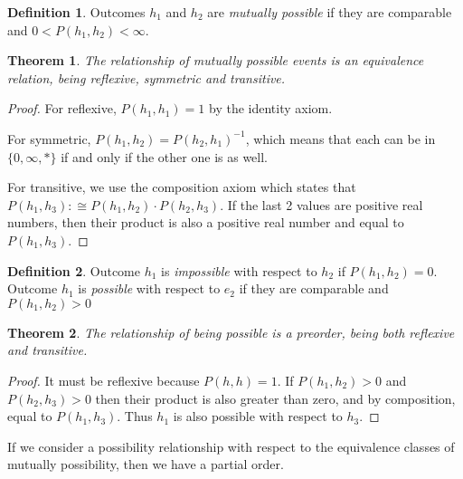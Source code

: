 \documentclass[twoside]{article}
\theoremstyle{plain}%
\newtheorem{theorem}{Theorem}[section]
\theoremstyle{definition}
\newtheorem{definition}{Definition}[section]
\theoremstyle{remark}
\begin{document}
\begin{definition}
Outcomes \(h_1\) and \(h_2\) are \textit{mutually possible} if they are comparable and \(0 < P(h_1, h_2) < \infty\).
\end{definition}

\begin{theorem}
The relationship of mutually possible events is an \textit{equivalence relation}, being reflexive, symmetric and transitive.
\end{theorem}

\begin{proof}
For reflexive, \(P(h_1, h_1) = 1\) by the identity axiom.

For symmetric, \(P(h_1, h_2) = P(h_2, h_1)^{-1}\), which means that each can be in \(\{0, \infty, \ast\}\) if and only if the other one is as well.

For transitive, we use the composition axiom which states that \(P(h_1, h_3) :\cong P(h_1, h_2) \cdot P(h_2, h_3)\). If the last 2 values are positive real numbers, then their product is also a positive real number and equal to \(P(h_1, h_3)\).
\end{proof}

\begin{definition}
Outcome \(h_1\) is \textit{impossible} with respect to \(h_2\) if \(P(h_1, h_2) = 0\). Outcome \(h_1\) is \textit{possible} with respect to \(e_2\) if they are comparable and \(P(h_1, h_2) > 0\)
\end{definition}

\begin{theorem}
The relationship of being possible is a \textit{preorder}, being both reflexive and transitive.
\end{theorem}

\begin{proof}
It must be reflexive because \(P(h, h) = 1\). If \(P(h_1, h_2) > 0\) and \(P(h_2, h_3) > 0\) then their product is also greater than zero, and by composition, equal to \(P(h_1, h_3)\). Thus \(h_1\) is also possible with respect to \(h_3\).
\end{proof}

If we consider a possibility relationship with respect to the equivalence classes of mutually possibility, then we have a partial order.
\end{document}
